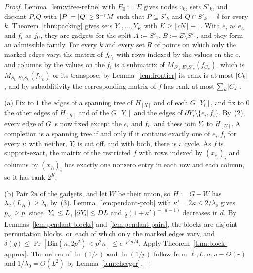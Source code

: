 \begin{proof}
Lemma~\ref{lem:vtree-refine} with $E_0:=E$ gives nodes $v_k$, sets $S'_k$, and disjoint $P,Q$ with $\lvert P\rvert=\lvert Q\rvert\ge3^{-r}M$ such that $P\subseteq S'_k$ and $Q\cap S'_k=\emptyset$ for every $k$. Theorem~\ref{thm:packing} gives sets $Y_1,\dots,Y_K$ with $K\ge\lfloor cN\rfloor+1$. With $e_i$ as $e_U$ and $f_i$ as $f_U$, they are gadgets for the split $A:=S'_1$, $B:=E\setminus S'_1$, and they form an admissible family. For every $k$ and every set $R$ of points on which only the marked edges vary, the matrix of $f_{C_k}$ with rows indexed by the values on the $e_i$ and columns by the values on the $f_i$ is a submatrix of $M_{S'_k,E\setminus S'_k}(f_{C_k})$, which is $M_{S_k,E\setminus S_k}(f_{C_k})$ or its transpose; by Lemma~\ref{lem:frontier} its rank is at most $\lvert C_k\rvert$, and by subadditivity the corresponding matrix of $f$ has rank at most $\sum_k\lvert C_k\rvert$.

(a) Fix to $1$ the edges of a spanning tree of $H_{[K]}$ and of each $G[Y_i]$, and fix to $0$ the other edges of $H_{[K]}$ and of the $G[Y_i]$ and the edges of $\partial Y_i\setminus\{e_i,f_i\}$. By~(2), every edge of $G$ is now fixed except the $e_i$ and $f_i$, and these join $Y_i$ to $H_{[K]}$. A completion is a spanning tree if and only if it contains exactly one of $e_i,f_i$ for every $i$: with neither, $Y_i$ is cut off, and with both, there is a cycle. As $f$ is support-exact, the matrix of the restricted $f$ with rows indexed by $(x_{e_i})_i$ and columns by $(x_{f_i})_i$ has exactly one nonzero entry in each row and each column, so it has rank $2^K$.

(b) Pair $2n$ of the gadgets, and let $W$ be their union, so $H:=G-W$ has $\lambda_2(L_H)\ge\lambda_0$ by~(3). Lemma~\ref{lem:pendant-prob} with $\kappa'=2\kappa\le2/\lambda_0$ gives $p_{Y_i}\ge p$, since $\lvert Y_i\rvert\le L$, $\lvert \partial Y_i\rvert\le DL$ and $\frac1d(1+\kappa')^{-(d-1)}$ decreases in $d$. By Lemmas~\ref{lem:pendant-blocks} and~\ref{lem:pendant-pairs}, the blocks are disjoint permutation blocks, on each of which only the marked edges vary, and $\delta(g)\le\Pr[\mathrm{Bin}(n,2p^2)<p^2n]\le e^{-p^2n/4}$. Apply Theorem~\ref{thm:block-approx}. The orders of $\ln(1/c)$ and $\ln(1/p)$ follow from $\ell,L,\sigma,s=\Theta(r)$ and $1/\lambda_0=O(L^2)$ by Lemma~\ref{lem:cheeger}.
\end{proof}

